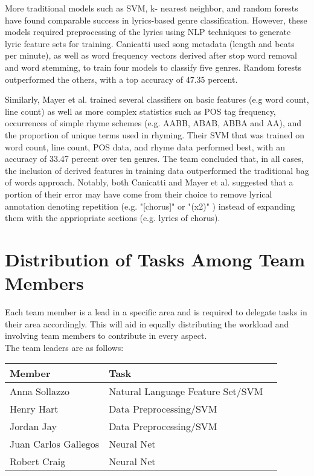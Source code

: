 \documentclass[journal]{IEEEtran}
\begin{document}
More traditional models such as SVM, k- nearest neighbor, and random forests have found comparable success in lyrics-based genre classification. However, these models required preprocessing of the lyrics using NLP techniques to generate lyric feature sets for training. Canicatti \cite{canicatti} used song metadata (length and beats per minute), as well as word frequency vectors derived after stop word removal and word stemming, to train four models to classify five genres. Random forests outperformed the others, with a top accuracy of 47.35 percent. \par

Similarly, Mayer et al. \cite{mayer} trained several classifiers on basic features (e.g word count, line count) as well as more complex statistics such as POS tag frequency, occurrences of simple rhyme schemes (e.g. AABB, ABAB, ABBA and AA), and the proportion of unique terms used in rhyming. Their SVM that was trained on word count, line count, POS data, and rhyme data performed best, with an accuracy of 33.47 percent over ten genres. The team concluded that, in all cases, the inclusion of derived features in training data outperformed the traditional bag of words approach. Notably, both Canicatti and Mayer et al. suggested that a portion of their error may have come from their choice to remove lyrical annotation denoting repetition (e.g. "[chorus]" or "(x2)" ) instead of expanding them with the appriopriate sections (e.g. lyrics of chorus).\par


\section{Distribution of Tasks Among Team Members}

Each team member is a lead in a specific area and is required to delegate tasks in their area accordingly. This will aid in equally distributing the workload and involving team members to contribute in every aspect.\\ 

The team leaders are as follows:

\begin{table}[h!]
    \label{tab:table1}
    \begin{tabular}{l|l|l|}
      \textbf{Member} & \textbf{Task}\\

      \hline
	Anna Sollazzo & Natural Language Feature Set/SVM\\
	Henry Hart & Data Preprocessing/SVM\\
	Jordan Jay & Data Preprocessing/SVM\\
	Juan Carlos Gallegos & Neural Net\\
	Robert Craig & Neural Net\\

    \end{tabular}
\end{table}
\end{document}
